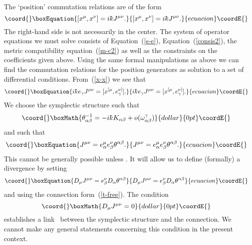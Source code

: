 \documentclass[12pt,a4paper]{article}
\newcounter{eg}
\def\kbar{{\mathchar'26\mkern-9muk}}
\begin{document}
The `position' commutation relations are of the form
\begin{equation}\coord{}\boxEquation{
[x^\mu, x^\nu] = i\kbar J^{\mu\nu}.                        \label{x-x}
}{
[x^\mu, x^\nu] = i\kbar J^{\mu\nu}.                        }{ecuacion}\coordE{}\end{equation}
The right-hand side is not necessarily in the center.  The system of
operator equations we must solve consists of Equation~(\ref{s-e}),
Equation~(\ref{consis2}), the metric compatibility
equation~(\ref{m-c2}) as well as the constraints on the coefficients
given above.  Using the same formal manipulations as above we can find
the commutation relations for the position generators as solution to a
set of differential conditions. From~(\ref{x-x}) we see that
\begin{equation}\coord{}\boxEquation{
i\kbar e_\gamma J^{\mu\nu} = [x^{[\mu}, e^{\nu]}_\gamma]  \label{pxx}.
}{
i\kbar e_\gamma J^{\mu\nu} = [x^{[\mu}, e^{\nu]}_\gamma]  .
}{ecuacion}\coordE{}\end{equation}
We choose the symplectic structure \myHighlight{$\theta^{\alpha\beta}$}\coordHE{} such that
$$\coord{}\boxMath{
\theta^{-1}_{\alpha\beta} = -i\kbar K_{\alpha\beta} + 
o(\omega^\gamma_{\alpha\beta})
}{dollar}{0pt}\coordE{}$$ 
and such that 
\begin{equation}\coord{}\boxEquation{
J^{\mu\nu} = 
e^\mu_\alpha e^\nu_\beta \theta^{\alpha\beta}.            \label{J-theta}
}{
J^{\mu\nu} = 
e^\mu_\alpha e^\nu_\beta \theta^{\alpha\beta}.            }{ecuacion}\coordE{}\end{equation}
This cannot be generally possible unless
\coordHE{}.  It will allow us to define
(formally) a divergence \coordHE{} by setting
\begin{equation}\coord{}\boxEquation{
D_\mu J^{\mu\nu} = 
e^\nu_\beta D_\alpha \theta^{\alpha\beta}           \label{div}
}{
D_\mu J^{\mu\nu} = 
e^\nu_\beta D_\alpha \theta^{\alpha\beta}           }{ecuacion}\coordE{}\end{equation}
and using the connection form~(\ref{t-free}).
The condition 
$$\coord{}\boxMath{
D_\mu J^{\mu\nu} =0 
}{dollar}{0pt}\coordE{}$$
establishes a link~\cite{BouCah99} between the symplectic structure
and the connection. We cannot make any general statements concerning
this condition in the present context.
\end{document}
